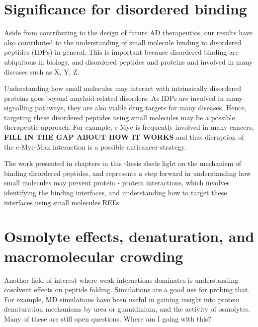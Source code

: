 \section{Significance for disordered binding}
Aside from contributing to the design of future AD therapeutics, our results have also contributed to the understanding of small molecule binding to disordered peptides (IDPs) in general. This is important because disordered binding are ubiquitous in biology, and disordered peptides and proteins and involved in many diseases such as X, Y, Z.  

Understanding how small molecules may interact with intrinsically disordered proteins goes beyond amyloid-related disorders. As IDPs are involved in many signalling pathways, they are also viable drug targets for many diseases.   Hence, targeting these disordered peptides using small molecules may be a possible therapeutic approach. For example, c-Myc is frequently involved in many cancers, \textbf{FILL IN THE GAP ABOUT HOW IT WORKS} and thus disruption of the c-Myc-Max interaction is a possible anticancer strategy.\cite{Iakoucheva:2002uv,Metallo:2010p6822,Cuchillo:2012bm}

The work presented in chapters in this thesis sheds light on the mechanism of binding disordered peptides, and represents a step forward in understanding how small molecules may prevent protein - protein interactions, which involves identifying the binding interfaces, and understanding how to target these interfaces using small molecules.REFs.

\section{Osmolyte effects, denaturation, and macromolecular crowding}

Another field of interest where weak interactions dominates is understanding cosolvent effects on peptide folding. Simulations are a good use for probing that.  For example, MD simulations have been useful in gaining insight into protein denaturation mechanisms by urea or guanidinium, and the activity of osmolytes. Many of these are still open questions.\cite{http://pubs.acs.org/doi/abs/10.1021/jp200625k -- crowding and protein association.} Where am I going with this?

